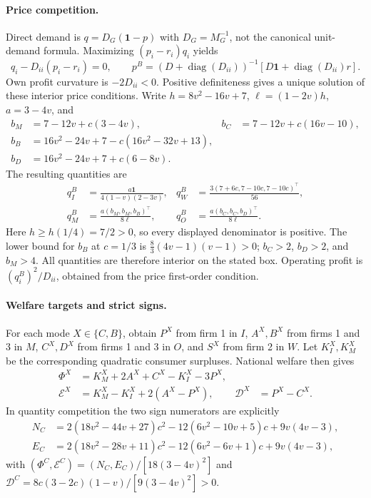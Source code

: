 \paragraph{Price competition.}
Direct demand is $q=D_G(\mathbf1-p)$ with $D_G=M_G^{-1}$, not the
canonical unit-demand formula. Maximizing $(p_i-r_i)q_i$ yields
\[
q_i-D_{ii}(p_i-r_i)=0,\qquad
p^B=(D+\operatorname{diag}(D_{ii}))^{-1}
 [D\mathbf1+\operatorname{diag}(D_{ii})r].
\]
Own profit curvature is $-2D_{ii}<0$. Positive definiteness gives a unique
solution of these interior price conditions. Write $h=8v^2-16v+7$,
$\ell=(1-2v)h$, $a=3-4v$, and
\begin{align*}
b_M&=7-12v+c(3-4v),& b_C&=7-12v+c(16v-10),\\
b_B&=16v^2-24v+7-c(16v^2-32v+13),\\
b_D&=16v^2-24v+7+c(6-8v).
\end{align*}
The resulting quantities are
\begin{align*}
q_I^B&=\frac{a\mathbf1}{4(1-v)(2-3v)},&
q_W^B&=\frac{3(7+6c,7-10c,7-10c)^\top}{56},\\
q_M^B&=\frac{a(b_M,b_M,b_B)^\top}{8\ell},&
q_O^B&=\frac{a(b_C,b_C,b_D)^\top}{8\ell}.
\end{align*}
Here $h\ge h(1/4)=7/2>0$, so every displayed denominator is positive.
The lower bound for $b_B$ at $c=1/3$ is
$\tfrac83(4v-1)(v-1)>0$; $b_C>2$, $b_D>2$, and $b_M>4$.
All quantities are therefore interior on the stated box. Operating profit is
$(q_i^B)^2/D_{ii}$, obtained from the price first-order condition.

\paragraph{Welfare targets and strict signs.}
For each mode $X\in\{C,B\}$, obtain $P^X$ from firm 1 in $I$,
$A^X,B^X$ from firms 1 and 3 in $M$, $C^X,D^X$ from firms 1 and 3
in $O$, and $S^X$ from firm 2 in $W$. Let $K_I^X,K_M^X$ be the
corresponding quadratic consumer surpluses. National welfare then gives
\begin{align*}
\Phi^X&=K_M^X+2A^X+C^X-K_I^X-3P^X,\\
\mathscr E^X&=K_M^X-K_I^X+2(A^X-P^X),&
\mathscr D^X&=P^X-C^X.
\end{align*}
In quantity competition the two sign numerators are explicitly
\begin{align*}
N_C&=2(18v^2-44v+27)c^2-12(6v^2-10v+5)c+9v(4v-3),\\
E_C&=2(18v^2-28v+11)c^2-12(6v^2-6v+1)c+9v(4v-3),
\end{align*}
with $(\Phi^C,\mathscr E^C)=(N_C,E_C)/[18(3-4v)^2]$ and
$\mathscr D^C=8c(3-2c)(1-v)/[9(3-4v)^2]>0$.

